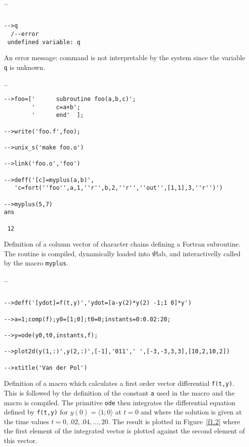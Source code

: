 \noindent.\dotfill.
\begin{verbatim}

-->q
  /--error 
 undefined variable: q       
\end{verbatim}
An error message: command is not interpretable by the system since the
variable {\tt q} is unknown.

\noindent.\dotfill.
\begin{verbatim}
-->foo=['      subroutine foo(a,b,c)';
        '      c=a+b';
        '      end'  ];

-->write('foo.f',foo);

-->unix_s('make foo.o') 

-->link('foo.o','foo')  

-->deff('[c]=myplus(a,b)',
   'c=fort(''foo'',a,1,''r'',b,2,''r'',''out'',[1,1],3,''r'')')

-->myplus(5,7)
ans

 12
\end{verbatim}
Definition of a column vector of character chains defining a Fortran
subroutine. The routine is compiled, dynamically loaded into $\Psi$lab,
and interactivelly called by the macro {\tt myplus}.

\noindent.\dotfill.
\begin{verbatim}
 
-->deff('[ydot]=f(t,y)','ydot=[a-y(2)*y(2) -1;1 0]*y')
 
-->a=1;comp(f);y0=[1;0];t0=0;instants=0:0.02:20;
 
-->y=ode(y0,t0,instants,f);
 
-->plot2d(y(1,:)',y(2,:)',[-1],'011',' ',[-3,-3,3,3],[10,2,10,2])
 
-->xtitle('Van der Pol')
\end{verbatim}
Definition of a macro which calculates a first order vector differential
{\tt f(t,y)}.  This is followed by the definition of the constant {\tt a}
used in the macro and the macro is compiled.  The primitive {\tt ode}
then integrates the differential equation defined by {\tt f(t,y)}
for $y(0)=\langle 1;0\rangle$ at $t=0$ and where the solution is given
at the time values $t=0,.02,.04,\ldots,20$.  The result is plotted in
Figure~\ref{f1.2} where the first element of the integrated vector is 
plotted against the second element of this vector.

